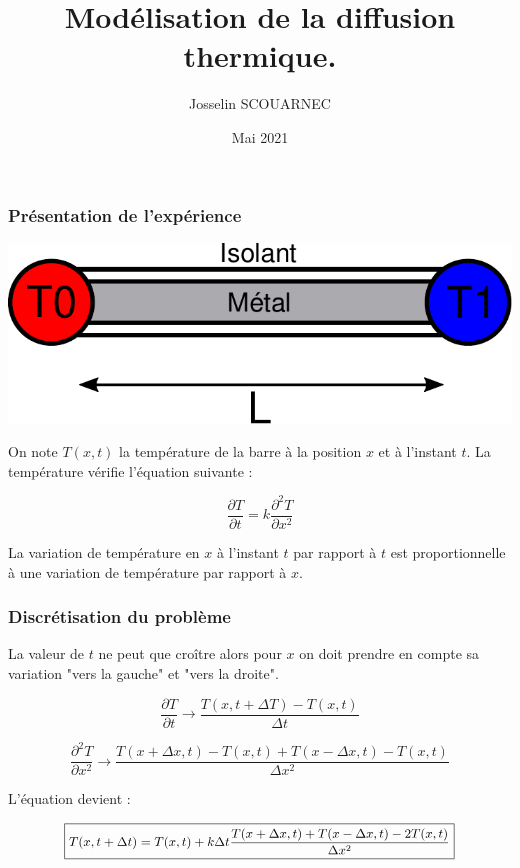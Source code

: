 \documentclass{beamer}
\title{Modélisation de la diffusion thermique.}
\author{Josselin SCOUARNEC}
\date{Mai 2021}
\begin{document}
    \maketitle
    

    \begin{frame}
    \frametitle{Présentation de l'expérience}

    \begin{center}
    \includegraphics[width=0.6\linewidth]{figs/schem.pdf}
    \end{center}

    On note $T(x, t)$ la température de la barre à la position $x$ et à l'instant $t$. La température vérifie l'équation suivante :

    $$\frac{\partial T}{\partial t } = k\frac{\partial^2 T}{\partial x^2 }$$

    La variation de température en $x$ à l'instant $t$ par rapport à $t$ est proportionnelle à une variation de température par rapport à $x$. 


    \end{frame}

    \begin{frame}
    \frametitle{Discrétisation du problème}

    La valeur de $t$ ne peut que croître alors pour $x$ on doit prendre en compte sa variation "vers la gauche" et "vers la droite".

    \bigskip

    $$\frac{\partial T}{\partial t } \longrightarrow \frac{T(x, t + \Delta T) - T(x, t)}{\Delta t }$$


   	$$\frac{\partial^2 T}{\partial x^2} \longrightarrow \frac{T(x+ \Delta x, t)-T(x, t) + T(x-\Delta x, t) -T(x, t)}{\Delta x ^2 }$$

    \bigskip

    L'équation devient : 

    $$\small\boxed{T(x, t + \Delta t) = T(x, t) + k \Delta t \frac{T(x+ \Delta x, t) + T(x-\Delta x, t) -2T(x, t)}{\Delta x ^2 }}$$


    \end{frame}
\end{document}
